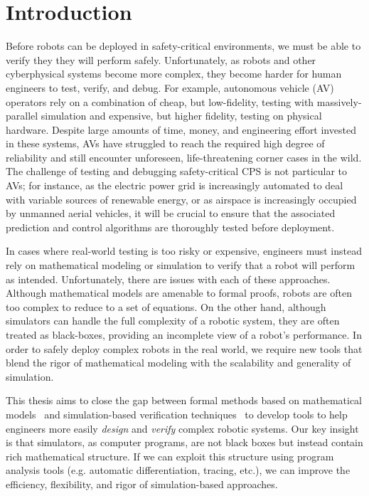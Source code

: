 \chapter{Introduction}\label{section:introduction}

Before robots can be deployed in safety-critical environments, we must be able to verify they they will perform safely. Unfortunately, as robots and other cyberphysical systems become more complex, they become harder for human engineers to test, verify, and debug. For example, autonomous vehicle (AV) operators rely on a combination of cheap, but low-fidelity, testing with massively-parallel simulation and expensive, but higher fidelity, testing on physical hardware. Despite large amounts of time, money, and engineering effort invested in these systems, AVs have struggled to reach the required high degree of reliability and still encounter unforeseen, life-threatening corner cases in the wild. The challenge of testing and debugging safety-critical CPS is not particular to AVs; for instance, as the electric power grid is increasingly automated to deal with variable sources of renewable energy, or as airspace is increasingly occupied by unmanned aerial vehicles, it will be crucial to ensure that the associated prediction and control algorithms are thoroughly tested before deployment.

In cases where real-world testing is too risky or expensive, engineers must instead rely on mathematical modeling or simulation to verify that a robot will perform as intended. Unfortunately, there are issues with each of these approaches. Although mathematical models are amenable to formal proofs, robots are often too complex to reduce to a set of equations. On the other hand, although simulators can handle the full complexity of a robotic system, they are often treated as black-boxes, providing an incomplete view of a robot's performance. In order to safely deploy complex robots in the real world, we require new tools that blend the rigor of mathematical modeling with the scalability and generality of simulation.

This thesis aims to close the gap between formal methods based on mathematical models~\cite{beltaFormalMethodsControl2019,kress-gazitSynthesisRobotsGuarantees2018} and simulation-based verification techniques~\cite{zhouRoCUSRobotController2021,corsoSurveyAlgorithmsBlackBox2021,okellyScalableEndtoEndAutonomous2018} to develop tools to help engineers more easily \textit{design} and \textit{verify} complex robotic systems. Our key insight is that simulators, as computer programs, are not black boxes but instead contain rich mathematical structure. If we can exploit this structure using program analysis tools (e.g. automatic differentiation, tracing, etc.), we can improve the efficiency, flexibility, and rigor of simulation-based approaches.

